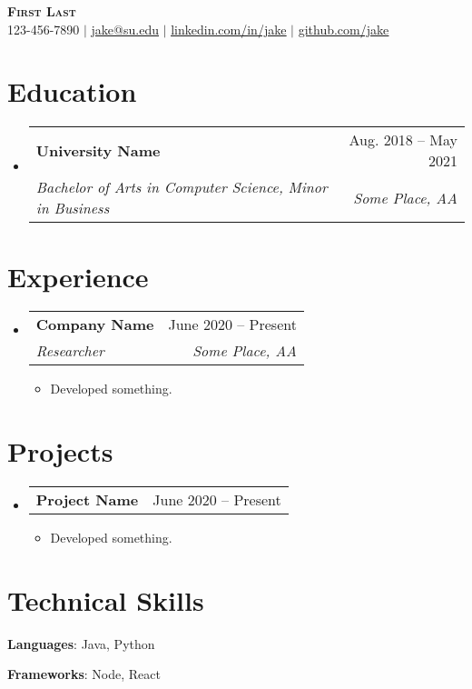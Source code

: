 \documentclass[letterpaper,12pt]{extarticle}
\makeatletter
\newcommand{\resumeItem}[1]{
  \item\normalsize{
      {#1 \vspace{-2pt}}
  }
}
\newcommand{\resumeSubheading}[4]{
  \vspace{-1pt}\item
  \begin{tabular*}{0.97\textwidth}[t]{l@{\extracolsep{\fill}}r}
  \textbf{#1} & \footnotesize #2 \\
  \textit{\normalsize #3} & \textit{\footnotesize #4} \\
  \end{tabular*}\vspace{-7pt}
}
\newcommand{\resumeProjectHeading}[2]{
  \item
  \begin{tabular*}{0.97\textwidth}{l@{\extracolsep{\fill}}r}
  \textbf{#1} & \normalsize #2 \\
  \end{tabular*}\vspace{-7pt}
}
\newcommand{\resumeSubHeadingListStart}{\begin{itemize}[leftmargin=0.15in, label={}]}
\newcommand{\resumeSubHeadingListEnd}{\end{itemize}}
\newcommand{\resumeItemListStart}{
\begin{itemize}
\itemsep 2pt
}
\newcommand{\resumeItemListEnd}{\end{itemize}\vspace{-5pt}}
\makeatother
\begin{document}
\begin{center}
\textbf{\Huge \scshape First Last} \\ \vspace{1pt}
\normalsize 123-456-7890 $|$ \href{mailto:x@x.com}{\underline{jake@su.edu}} $|$
\href{https://linkedin.com/in/...}{\underline{linkedin.com/in/jake}} $|$
\href{https://github.com/...}{\underline{github.com/jake}}
\end{center}

\section{Education}
\resumeSubHeadingListStart
\resumeSubheading
{University Name}{Aug. 2018 -- May 2021}
{Bachelor of Arts in Computer Science, Minor in Business}{Some Place, AA}
\resumeSubHeadingListEnd

\section{Experience}
\resumeSubHeadingListStart
\resumeSubheading
{Company Name}{June 2020 -- Present}
{Researcher}{Some Place, AA}
\resumeItemListStart
\resumeItem{Developed something.}
\resumeItemListEnd
\resumeSubHeadingListEnd

\section{Projects}
\resumeSubHeadingListStart
\resumeProjectHeading
{\textbf{Project Name}}{June 2020 -- Present}
\resumeItemListStart
\resumeItem{Developed something.}
\resumeItemListEnd
\resumeSubHeadingListEnd

\section{Technical Skills}
\begin{itemize}[leftmargin=0.15in, label={}]
\itemsep -2pt
\normalsize{\item{
\textbf{Languages}{: Java, Python} \\
}}
\normalsize{\item{
\textbf{Frameworks}{: Node, React} \\
}}
\end{itemize}

\end{document}
